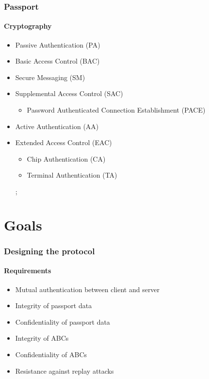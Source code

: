 \documentclass[hyperref={urlcolor=black, citecolor=black, pdfpagemode=UseNone, pdfpagelayout=SinglePage, pdfstartview=}]{beamer}
\begin{document}
\begin{frame}
  \frametitle{Passport}  
  \framesubtitle{Cryptography}
  \begin{itemize}
    \item Passive Authentication (PA)
    \item Basic Access Control (BAC)
    \item Secure Messaging (SM)
    \item Supplemental Access Control (SAC)
    \begin{itemize}
      \item Password Authenticated Connection Establishment (PACE)
    \end{itemize}
    \item Active Authentication (AA)
    \item Extended Access Control (EAC)
    \begin{itemize}
      \item Chip Authentication (CA)
      \item Terminal Authentication (TA)
    \end{itemize}
    \vspace*{0.6cm}
    ;
  \end{itemize}  
\end{frame}

\section{Goals}
\begin{frame}
  \frametitle{Designing the protocol}
  \framesubtitle{Requirements}
  \begin{itemize}
    \item Mutual authentication between client and server
    \item Integrity of passport data
    \item Confidentiality of passport data
    \item Integrity of ABCs
    \item Confidentiality of ABCs
    \item Resistance against replay attacks
  \end{itemize}
\end{frame}
\end{document}
